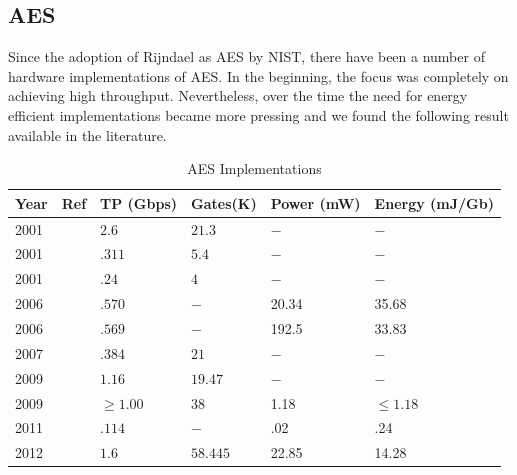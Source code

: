 \documentclass[lnicst,sechang,a4paper]{svmultln}
\begin{document}
\subsection{AES} Since the adoption of Rijndael as AES by NIST, there have been a number of hardware implementations of AES. In the beginning, the focus was completely on achieving high throughput. Nevertheless, over the time the need for energy efficient implementations became more pressing and we found the following result available in the literature. \newline


\begin{table}
\begin{center}
\begin{tabular}{|p{}
				|p{}
				|p{}
				|p{}
				|p{}
				|p{}|
				}
\hline
Year & Ref & TP (Gbps) & Gates(K) & Power (mW) & Energy (mJ/Gb) \\
\hline
2001 & \cite{IBM_Japan_2001} &$2.6$ &$21.3$  & $-$ & $-$ \\ \hline
2001 & \cite{IBM_Japan_2001} &$.311$ &$5.4$  & $-$ & $-$ \\ \hline
2001 & \cite{IBM_India_IIT_2001} &$.24$ &$4$  & $-$ & $-$ \\ \hline
2006 & \cite{Taiwan_2006} &$.570$ & $-$ &20.34 & 35.68 \\ \hline
2006 & \cite{Taiwan_2006} &$.569$ & $-$ &192.5 & 33.83 \\ \hline
2007 & \cite{IIT_Kharagpur_2007} &$.384$ &$21$ & $-$  & $-$ \\ \hline
2009 & \cite{IME_China_Tsinghua_Univerisity_2009} &$1.16$ &$19.47$ & $-$ & $-$ \\ \hline
2009 & \cite{Ruhr_2009} &$\geq 1.00$ &$38$ &1.18 & $\leq 1.18$ \\ \hline
2011 & \cite{Ruhr_2011} &$.114$ &$ - $ &.02 & .24 \\ \hline
2012 & \cite{Pune_2012} &$1.6$ &$58.445$ &22.85 & 14.28 \\ \hline
\end{tabular}
\end{center}
\caption{AES Implementations}
\label{table:aes_implementation}
\end{table}
\end{document}
